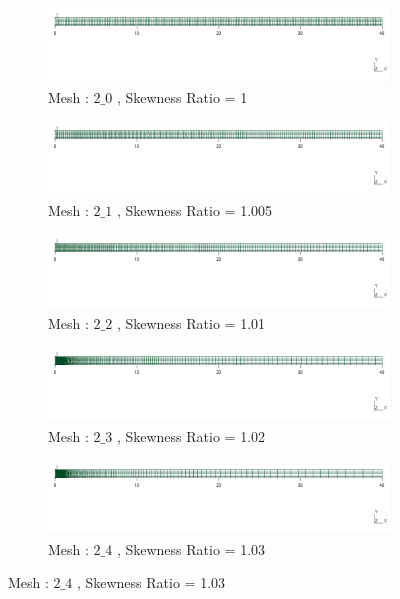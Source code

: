 \documentclass[9pt]{beamer}
\begin{document}
\begin{frame}


\begin{figure}[h!]
\centering
\begin{subfigure}{1\textwidth}
\includegraphics[width=\linewidth,trim={0.2cm 5.6cm 0.2cm 1cm},clip]{Mesh_Dependency/meshes/2_0.png}
\caption{Mesh : $2\_0$ , Skewness Ratio = 1}
\end{subfigure} \vfill
\begin{subfigure}{1\textwidth}
\includegraphics[width=\linewidth,trim={0.2cm 5.6cm 0.2cm 1cm},clip]{Mesh_Dependency/meshes/2_1.png}
\caption{Mesh : $2\_1$ , Skewness Ratio = 1.005}
\end{subfigure}\vfill
\begin{subfigure}{1\textwidth}
\includegraphics[width=\linewidth,trim={0.2cm 5.6cm 0.2cm 1cm},clip]{Mesh_Dependency/meshes/2_2.png}
\caption{Mesh : $2\_2$ , Skewness Ratio = 1.01}
\end{subfigure}\vfill
\begin{subfigure}{1\textwidth}
\includegraphics[width=\linewidth,trim={0.2cm 5.6cm 0.2cm 1cm},clip]{Mesh_Dependency/meshes/2_3.png}
\caption{Mesh : $2\_3$ , Skewness Ratio = 1.02}
\end{subfigure}\vfill
\begin{subfigure}{1\textwidth}
\includegraphics[width=\linewidth,trim={0.2cm 5.6cm 0.2cm 1cm},clip]{Mesh_Dependency/meshes/2_4.png}
\caption{Mesh : $2\_4$ , Skewness Ratio = 1.03}
\end{subfigure}


\end{figure}
\end{frame}
\end{document}
